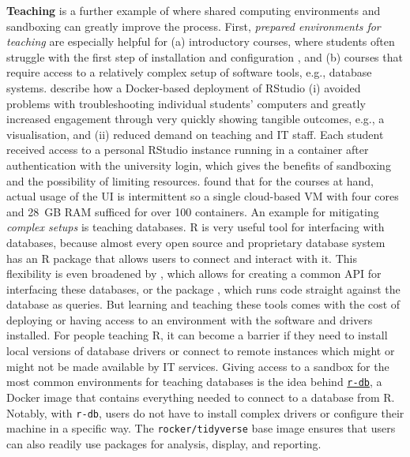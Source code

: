 \textbf{Teaching} is a further example of where shared computing
environments and sandboxing can greatly improve the process. First,
\emph{prepared environments for teaching} are especially helpful for (a)
introductory courses, where students often struggle with the first step
of installation and configuration
\citep{cetinkaya-rundel_infrastructure_2018}, and (b) courses that
require access to a relatively complex setup of software tools, e.g.,
database systems. \citet{cetinkaya-rundel_infrastructure_2018} describe
how a Docker-based deployment of RStudio (i) avoided problems with
troubleshooting individual students' computers and greatly increased
engagement through very quickly showing tangible outcomes, e.g., a
visualisation, and (ii) reduced demand on teaching and IT staff. Each
student received access to a personal RStudio instance running in a
container after authentication with the university login, which gives
the benefits of sandboxing and the possibility of limiting resources.
\citet{cetinkaya-rundel_infrastructure_2018} found that for the courses
at hand, actual usage of the UI is intermittent so a single cloud-based
VM with four cores and 28~GB RAM sufficed for over 100 containers. An
example for mitigating \emph{complex setups} is teaching databases. R is
very useful tool for interfacing with databases, because almost every
open source and proprietary database system has an R package that allows
users to connect and interact with it. This flexibility is even
broadened by  \citep{cran_dbi}, which allows for creating a
common API for interfacing these databases, or the 
package \citep{cran_dbplyr}, which runs 
\citep{cran_dplyr} code straight against the database as queries. But
learning and teaching these tools comes with the cost of deploying or
having access to an environment with the software and drivers installed.
For people teaching R, it can become a barrier if they need to install
local versions of database drivers or connect to remote instances which
might or might not be made available by IT services. Giving access to a
sandbox for the most common environments for teaching databases is the
idea behind \href{https://github.com/ColinFay/r-db}{\texttt{r-db}}, a
Docker image that contains everything needed to connect to a database
from R. Notably, with \texttt{r-db}, users do not have to install
complex drivers or configure their machine in a specific way. The
\texttt{rocker/tidyverse} base image ensures that users can also readily
use packages for analysis, display, and reporting.

